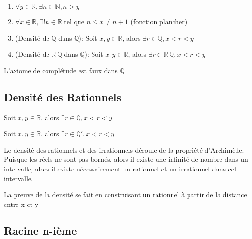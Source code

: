 \documentclass{article}
\begin{document}
\begin{corollary}
    \begin{enumerate}
	\item $ \forall y \in \mathbb{R}, \exists n \in \mathbb{N}, n>y$
	\item $ \forall x \in \mathbb{R}, \exists! n \in \mathbb{R}$ tel que
	    $n \leq x \neq n+1$ (fonction plancher)
	\item (Densité de $\mathbb{Q}$ dans $\mathbb{Q}$): Soit $x,y \in \mathbb{R}$,
	    alors $\exists r \in \mathbb{Q}, x<r<y$
	\item (Densité de $\mathbb{R} \ \mathbb{Q}$ dans $\mathbb{Q}$): Soit $x,y \in \mathbb{R}$,
	    alors $\exists r \in \mathbb{R} \ \mathbb{Q}, x<r<y$
    \end{enumerate}
\end{corollary}

\begin{theorem}
    L'axiome de complétude est faux dans $\mathbb{Q}$
\end{theorem}

\subsection{Densité des Rationnels}

\begin{theorem}
    Soit $x,y \in \mathbb{R}$, alors $\exists r \in \mathbb{Q}, x<r<y$
\end{theorem}

\begin{theorem}
    Soit $x,y \in \mathbb{R}$, alors $\exists r \in \mathbb{Q} ', x<r<y$
\end{theorem}

\begin{remark}
    Le densité des rationnels et des irrationnels découle de la propriété
    d'Archimède. Puisque les réels ne sont pas bornés, alors il existe une
    infinité de nombre dans un intervalle, alors il existe nécessairement un
    rationnel et un irrationnel dans cet intervalle.
\end{remark}

\begin{intuition}
    La preuve de la densité se fait en construisant un rationnel à partir de la
    distance entre x et y
\end{intuition}

\subsection{Racine n-ième}
\end{document}
